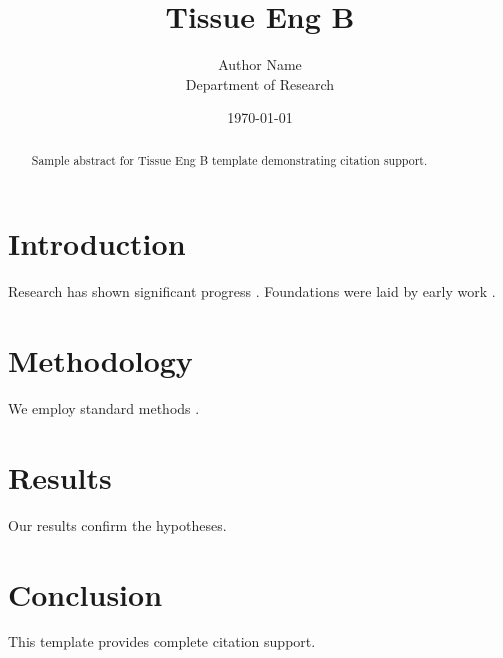 \documentclass{oup}
\title{Tissue Eng B}
\author{Author Name \\ \small Department of Research}
\date{\today}
\begin{document}
\maketitle

\begin{abstract}
Sample abstract for Tissue Eng B template demonstrating citation support.
\end{abstract}

\section{Introduction}
Research has shown significant progress \citep{einstein1905}. Foundations were laid by early work \citep{turing1950}.

\section{Methodology}
We employ standard methods \citep{knuth1984}.

\section{Results}
Our results confirm the hypotheses.

\section{Conclusion}
This template provides complete citation support.



\end{document}
